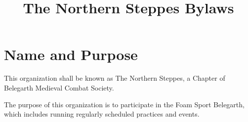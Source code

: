 \documentclass[12pt]{article}
\title{The Northern Steppes Bylaws}
\begin{document}

\section{Name and Purpose}
\begin{level}
\item This organization shall be known as The Northern Steppes, a Chapter of Belegarth Medieval Combat Society.
\item The purpose of this organization is to participate in the Foam Sport Belegarth, which includes running regularly scheduled practices and events.
\end{level}
\end{document}
